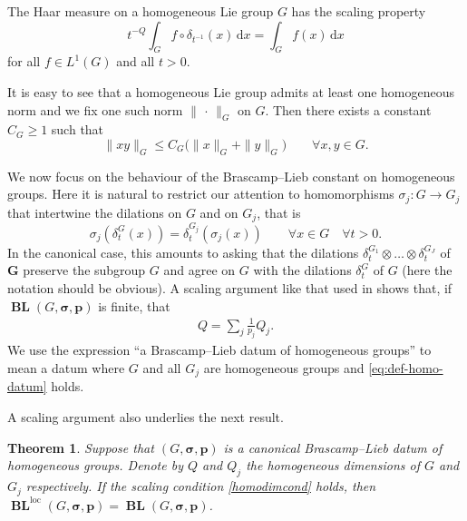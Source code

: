 \documentclass[12pt,twoside,a4paper]{amsart}
\newtheorem{thm}{Theorem}[section]
\theoremstyle{definition}
\theoremstyle{remark}
\numberwithin{equation}{section}
\newcommand{\loc}{\mathrm{loc}}
\newcommand{\wrt}[1]{\,\mathrm{d} #1}
\newcommand{\BL}{\operatorname{\mathbf{BL}}}
\newcommand{\bss}{\boldsymbol{\sigma}}
\newcommand{\bsp}{\boldsymbol{p}}
\newcommand{\bsG}{\boldsymbol{G}}
\begin{document}
The Haar measure on a homogeneous Lie group $G$ has the scaling property
\begin{equation*}
 t^{-Q} \int_{G} f \circ \delta_{t^{-1}}(x) \wrt x = \int_{G} f(x) \wrt x 
\end{equation*}
for all $f \in L^1(G)$ and all $t > 0$.

It is easy to see that a homogeneous Lie group admits at least one homogeneous norm and we  fix one such norm $\|\,\cdot\,\|_{G}$ on $G$.
Then there exists a constant $C_G \geq 1$ such that 
\begin{equation}\label{eq: quasi triangle}
   \|x y\|_{G} \leq C_G\bigl(\|x\|_{G} + \|y\|_{G}\bigr) 
\qquad\forall x, y \in G.
\end{equation}



We now focus on the behaviour of the Brascamp--Lieb constant on homogeneous groups.
Here it is natural to restrict our attention to homomorphisms $\sigma_j \colon  G \to G_j$ that intertwine the dilations on $G$ and on $G_j$, that is
\begin{equation}\label{eq:def-homo-datum}
\sigma_j (\delta^G_t(x)) = \delta^{G_j}_t (\sigma_j (x)) 
\qquad\forall x \in G \quad\forall t > 0.
\end{equation}
In the canonical case, this amounts to asking that the dilations $\delta^{G_1}_t \otimes \dots \otimes \delta^{G_J}_t$ of $\bsG$ preserve the subgroup $G$ and agree on $G$  with the dilations $\delta^{G}_t$ of $G$ (here the notation should be obvious).
A scaling argument like that used in \cite{BCCT08} shows that, if $\BL(G, \bss,\bsp)$ is finite, that 
\begin{align}\label{homodimcond}
Q=\sum_j \frac{1}{p_j} Q_j  .
\end{align}
We use the expression ``a Brascamp--Lieb datum of homogeneous groups'' to mean a datum where $G$ and all $G_j$ are homogeneous groups and \eqref{eq:def-homo-datum} holds.

A scaling argument also underlies the next result.

\begin{thm}\label{thm:G-loc-G}
Suppose that $(G,\bss ,\bsp)$ is a canonical Brascamp--Lieb datum of homogeneous groups.
Denote by $Q$ and $Q_j$ the homogeneous dimensions of $G$ and $G_j$ respectively.
If the scaling condition \eqref{homodimcond} holds, then $\BL^{\loc}(G,\bss ,\bsp)= \BL(G,\bss ,\bsp)$.
\end{thm}
\end{document}
